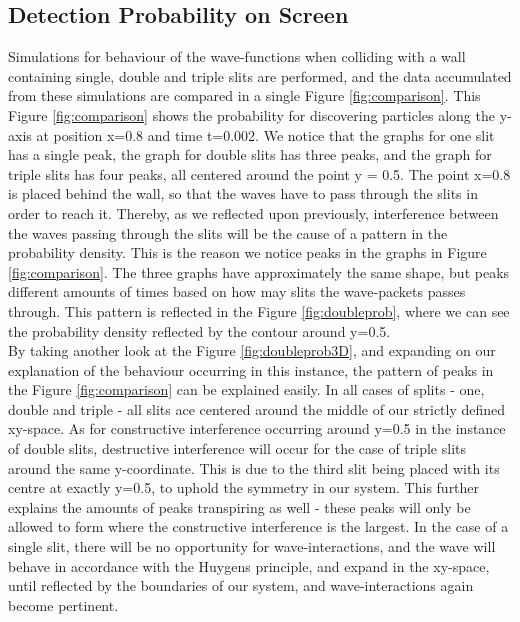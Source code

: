 \documentclass[10pt, nofootinbib, twocolumn]{revtex4-1}
\begin{document}
\subsection{Detection Probability on Screen}
Simulations for behaviour of the wave-functions when colliding with a wall containing single, double and triple slits are performed, and the data accumulated from these simulations are compared in a single Figure \ref{fig:comparison}. This Figure \ref{fig:comparison} shows the probability for discovering particles along the y-axis at position x=0.8 and time t=0.002. We notice that the graphs for one slit has a single peak, the graph for double slits has three peaks, and the graph for triple slits has four peaks, all centered around the point y = 0.5. The point x=0.8 is placed behind the wall, so that the waves have to pass through the slits in order to reach it. Thereby, as we reflected upon previously, interference between the waves passing through the slits will be the cause of a pattern in the probability density. This is the reason we notice peaks in the graphs in Figure \ref{fig:comparison}. The three graphs have approximately the same shape, but peaks different amounts of times based on how may slits the wave-packets passes through. This pattern is reflected in the Figure \ref{fig:doubleprob}, where we can see the probability density reflected by the contour around y=0.5. \\

By taking another look at the Figure \ref{fig:doubleprob3D}, and expanding on our explanation of the behaviour occurring in this instance, the pattern of peaks in the Figure \ref{fig:comparison} can be explained easily. In all cases of splits - one, double and triple - all slits ace centered around the middle of our strictly defined xy-space. As for constructive interference occurring around y=0.5 in the instance of double slits, destructive interference will occur for the case of triple slits around the same y-coordinate. This is due to the third slit being placed with its centre at exactly y=0.5, to uphold the symmetry in our system. This further explains the amounts of peaks transpiring as well - these peaks will only be allowed to form where the constructive interference is the largest. In the case of a single slit, there will be no opportunity for wave-interactions, and the wave will behave in accordance with the Huygens principle, and expand in the xy-space, until reflected by the boundaries of our system, and wave-interactions again become pertinent. 
\end{document}
